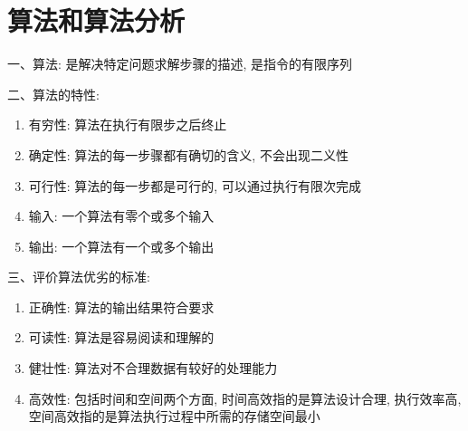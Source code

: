 \section{算法和算法分析}

\begin{definition}[算法的定义及其特性]
    一、算法: 是解决特定问题求解步骤的描述, 是指令的有限序列

    二、算法的特性:
    \begin{enumerate}
        \item 有穷性: 算法在执行有限步之后终止 
        \item 确定性: 算法的每一步骤都有确切的含义, 不会出现二义性
        \item 可行性: 算法的每一步都是可行的, 可以通过执行有限次完成
        \item 输入: 一个算法有零个或多个输入
        \item 输出: 一个算法有一个或多个输出
    \end{enumerate}
    三、评价算法优劣的标准:
    \begin{enumerate}
        \item 正确性: 算法的输出结果符合要求
        \item 可读性: 算法是容易阅读和理解的
        \item 健壮性: 算法对不合理数据有较好的处理能力
        \item 高效性: 包括时间和空间两个方面, 时间高效指的是算法设计合理, 执行效率高, 空间高效指的是算法执行过程中所需的存储空间最小
    \end{enumerate}
\end{definition}
